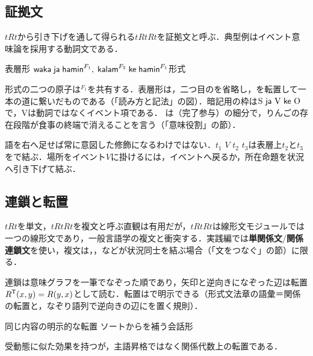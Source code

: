 \documentclass[../../main-detail.tex]{subfiles}
\begin{document}
\subsection{証拠文}
$tRt$から引き下げを通して得られる$tRtRt$を証拠文と呼ぶ．典型例はイベント意味論を採用する動詞文である．
\begin{exe}
    \ex\begin{xlist}
        \ex {}\hfill 表層形
        \ex $\textsf{waka}\;\textsf{ja}\;\textsf{hamin}^{F_1},\;\textsf{kalam}^{F_2}\;\textsf{ke}\;\textsf{hamin}^{F_1}$\hfill 形式
    \end{xlist}
    \glt {}
\end{exe}
形式の二つの原子は$^{F_1}$を共有する．表層形は，二つ目のを省略し，を転置して一本の道に繋いだものである（「読み方と記法」の図）．暗記用の枠は$\text{S \textsf{ja} V \textsf{ke} O}$で，Vは動詞ではなくイベント項である．
は（完了参与）の細分で，りんごの存在段階が食事の終端で消えることを言う（「意味役割」の節）．

語を右へ足せば常に意図した修飾になるわけではない．$t_1$  $V$  $t_2$  $t_3$は表層上$t_2$と$t_3$をで結ぶ．場所をイベント$V$に掛けるには，イベントへ戻るか，所在命題を状況へ引き下げて結ぶ．

\subsection{連鎖と転置}
$tRt$を単文，$tRtRt$を複文と呼ぶ直観は有用だが，$tRtRt$は線形文モジュールでは一つの線形文であり，一般言語学の複文と衝突する．実践編では\textbf{単関係文}/\textbf{関係連鎖文}を使い，複文は，，などが状況同士を結ぶ場合（「文をつなぐ」の節）に限る．

連鎖は意味グラフを一筆でなぞった順であり，矢印と逆向きになぞった辺は転置$R^{\mathsf{T}}(x,y) = R(y,x)$として読む．転置はで明示できる（形式文法章の語彙＝関係の転置と，なぞり語列で逆向きの辺にを置く規則）．
\begin{exe}
    \ex\begin{xlist}
        \ex {}\hfill {}
        \ex {}\hfill 同じ内容の明示的な転置
        \ex {}\hfill ソートからを補う会話形
    \end{xlist}
\end{exe}
受動態に似た効果を持つが，主語昇格ではなく関係代数上の転置である．
\end{document}

